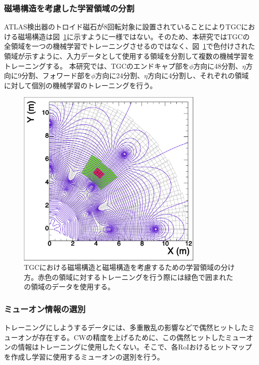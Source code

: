 \subsubsection{磁場構造を考慮した学習領域の分割}
ATLAS検出器のトロイド磁石が8回転対象に設置されていることによりTGCにおける磁場構造は図~\ref{fig:Mag}に示すように一様ではない。そのため、本研究ではTGCの全領域を一つの機械学習でトレーニングさせるのではなく、図~\ref{fig:Mag}で色付けされた領域が示すように、入力データとして使用する領域を分割して複数の機械学習をトレーニングする。
本研究では、TGCのエンドキャプ部を$\phi$方向に48分割、$\eta$方向に9分割、フォワード部を$\phi$方向に24分割、$\eta$方向に4分割し、それぞれの領域に対して個別の機械学習のトレーニングを行う。
\begin{figure}[tb]
  \centering
  \includegraphics[clip, width=9cm]{fig/4/c1_withMag.pdf}
  \caption{TGCにおける磁場構造と磁場構造を考慮するための学習領域の分け方。赤色の領域に対するトレーニングを行う際には緑色で囲まれたの領域のデータを使用する。}
  \label{fig:Mag}
\end{figure}

\subsubsection{ミューオン情報の選別}
トレーニングにしようするデータには、多重散乱の影響などで偶然ヒットしたミューオンが存在する。CWの精度を上げるために、この偶然ヒットしたミューオンの情報はトレーニングに使用したくない。そこで、各RoIおけるヒットマップを作成し学習に使用するミューオンの選別を行う。

